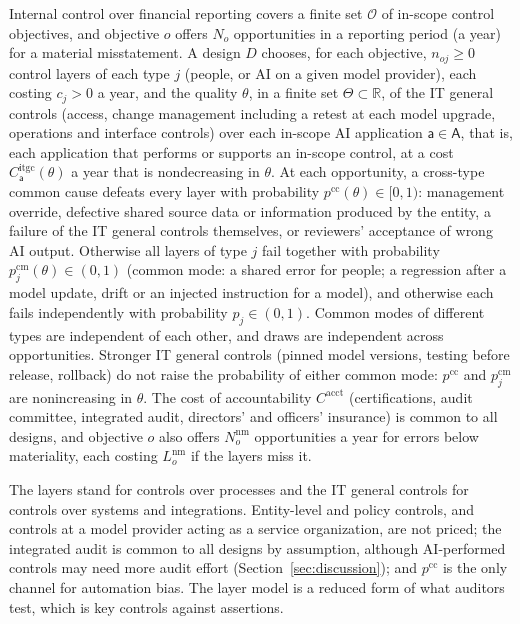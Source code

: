 \begin{assumption}\label{ass:layers}
Internal control over financial reporting covers a finite set $\mathcal O$ of in-scope control objectives, and objective $o$ offers $N_o$ opportunities in a reporting period (a year) for a material misstatement. A design $D$ chooses, for each objective, $n_{oj}\ge0$ control layers of each type $j$ (people, or AI on a given model provider), each costing $c_j>0$ a year, and the quality $\theta$, in a finite set $\Theta\subset\mathbb R$, of the IT general controls (access, change management including a retest at each model upgrade, operations and interface controls) over each in-scope AI application $\mathsf a\in\mathsf A$, that is, each application that performs or supports an in-scope control, at a cost $C^{\mathrm{itgc}}_{\mathsf a}(\theta)$ a year that is nondecreasing in $\theta$. At each opportunity, a cross-type common cause defeats every layer with probability $p^{\mathrm{cc}}(\theta)\in[0,1)$: management override, defective shared source data or information produced by the entity, a failure of the IT general controls themselves, or reviewers' acceptance of wrong AI output. Otherwise all layers of type $j$ fail together with probability $p^{\mathrm{cm}}_j(\theta)\in(0,1)$ (common mode: a shared error for people; a regression after a model update, drift or an injected instruction for a model), and otherwise each fails independently with probability $p_j\in(0,1)$. Common modes of different types are independent of each other, and draws are independent across opportunities. Stronger IT general controls (pinned model versions, testing before release, rollback) do not raise the probability of either common mode: $p^{\mathrm{cc}}$ and $p^{\mathrm{cm}}_j$ are nonincreasing in $\theta$. The cost of accountability $C^{\mathrm{acct}}$ (certifications, audit committee, integrated audit, directors' and officers' insurance) is common to all designs, and objective $o$ also offers $N^{\mathrm{nm}}_o$ opportunities a year for errors below materiality, each costing $L^{\mathrm{nm}}_o$ if the layers miss it.
\end{assumption}

\noindent The layers stand for controls over processes and the IT general controls for controls over systems and integrations. Entity-level and policy controls, and controls at a model provider acting as a service organization, are not priced; the integrated audit is common to all designs by assumption, although AI-performed controls may need more audit effort (Section~\ref{sec:discussion}); and $p^{\mathrm{cc}}$ is the only channel for automation bias. The layer model is a reduced form of what auditors test, which is key controls against assertions.

